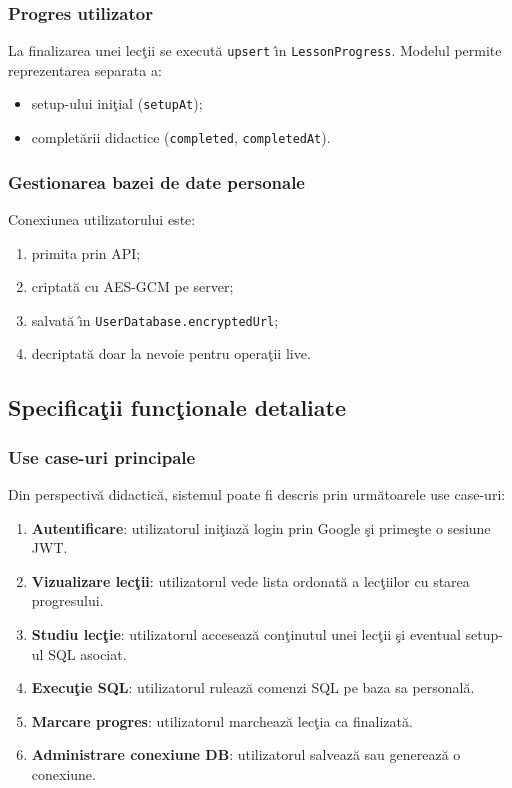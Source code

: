 \documentclass[12pt,onecolumn,draftclsnofoot]{IEEEtran}
\begin{document}
\subsubsection{Progres utilizator}
La finalizarea unei lec\c{t}ii se execut\u{a} \texttt{upsert} \^{\i}n \texttt{LessonProgress}. Modelul permite reprezentarea separata a:
\begin{itemize}
  \item setup-ului ini\c{t}ial (\texttt{setupAt});
  \item complet\u{a}rii didactice (\texttt{completed}, \texttt{completedAt}).
\end{itemize}

\subsubsection{Gestionarea bazei de date personale}
Conexiunea utilizatorului este:
\begin{enumerate}[label=\arabic*)]
  \item primita prin API;
  \item criptat\u{a} cu AES-GCM pe server;
  \item salvat\u{a} \^{\i}n \texttt{UserDatabase.encryptedUrl};
  \item decriptat\u{a} doar la nevoie pentru opera\c{t}ii live.
\end{enumerate}
\subsection{Specifica\c{t}ii func\c{t}ionale detaliate}
\subsubsection{Use case-uri principale}
Din perspectiv\u{a} didactic\u{a}, sistemul poate fi descris prin urm\u{a}toarele use case-uri:
\begin{enumerate}[label=\arabic*)]
  \item \textbf{Autentificare}: utilizatorul ini\c{t}iaz\u{a} login prin Google \c{s}i prime\c{s}te o sesiune JWT.
  \item \textbf{Vizualizare lec\c{t}ii}: utilizatorul vede lista ordonat\u{a} a lec\c{t}iilor cu starea progresului.
  \item \textbf{Studiu lec\c{t}ie}: utilizatorul acceseaz\u{a} con\c{t}inutul unei lec\c{t}ii \c{s}i eventual setup-ul SQL asociat.
  \item \textbf{Execu\c{t}ie SQL}: utilizatorul ruleaz\u{a} comenzi SQL pe baza sa personal\u{a}.
  \item \textbf{Marcare progres}: utilizatorul marcheaz\u{a} lec\c{t}ia ca finalizat\u{a}.
  \item \textbf{Administrare conexiune DB}: utilizatorul salveaz\u{a} sau genereaz\u{a} o conexiune.
\end{enumerate}
\end{document}
